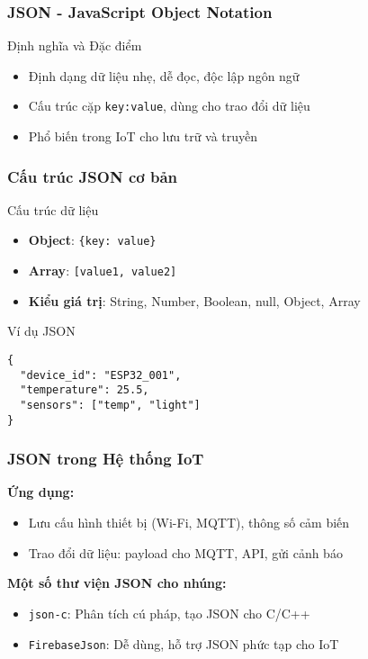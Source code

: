 \begin{frame}
\frametitle{JSON - JavaScript Object Notation}

\begin{block}{Định nghĩa và Đặc điểm}
\begin{itemize}
\item Định dạng dữ liệu nhẹ, dễ đọc, độc lập ngôn ngữ
\item Cấu trúc cặp \texttt{key:value}, dùng cho trao đổi dữ liệu
\item Phổ biến trong IoT cho lưu trữ và truyền
\end{itemize}
\end{block}

\end{frame}

\begin{frame}[fragile]
\frametitle{Cấu trúc JSON cơ bản}

\begin{block}{Cấu trúc dữ liệu}
\begin{itemize}
\item \textbf{Object}: \texttt{\{key: value\}}
\item \textbf{Array}: \texttt{[value1, value2]}
\item \textbf{Kiểu giá trị}: String, Number, Boolean, null, Object, Array
\end{itemize}
\end{block}

\begin{exampleblock}{Ví dụ JSON}
\begin{verbatim}
{
  "device_id": "ESP32_001",
  "temperature": 25.5,
  "sensors": ["temp", "light"]
}
\end{verbatim}
\end{exampleblock}
\end{frame}

\begin{frame}
\frametitle{JSON trong Hệ thống IoT}

\textbf{Ứng dụng:}
\begin{itemize}
    \item Lưu cấu hình thiết bị (Wi-Fi, MQTT), thông số cảm biến
    \item Trao đổi dữ liệu: payload cho MQTT, API, gửi cảnh báo
\end{itemize}

\vspace{0.3cm}
\textbf{Một số thư viện JSON cho nhúng:}
\begin{itemize}
    \item \texttt{json-c}: Phân tích cú pháp, tạo JSON cho C/C++
    \item \texttt{FirebaseJson}: Dễ dùng, hỗ trợ JSON phức tạp cho IoT
\end{itemize}

\end{frame}


